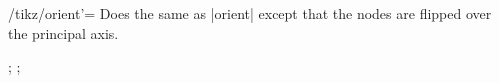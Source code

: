 \begin{key}{/tikz/orient'=}
  Does the same as |orient| except that the nodes are flipped over the
  principal axis.
  \begin{codeexample}[]
\tikz {};
\tikz {};
  \end{codeexample}
\end{key}


